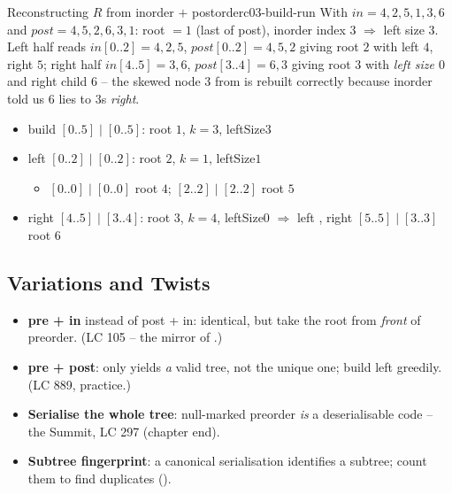\begin{example}{Reconstructing $R$ from inorder $+$ postorder}{c03-build-run}
With $\mathit{in}=4,2,5,1,3,6$ and $\mathit{post}=4,5,2,6,3,1$: root $=1$ (last of post),
inorder index $3$ $\Rightarrow$ left size $3$. Left half reads $\mathit{in}[0..2]=4,2,5$,
$\mathit{post}[0..2]=4,5,2$ giving root $2$ with left $4$, right $5$; right half
$\mathit{in}[4..5]=3,6$, $\mathit{post}[3..4]=6,3$ giving root $3$ with \emph{left size
$0$} and right child $6$ -- the skewed node $3$ from  is rebuilt
correctly because inorder told us $6$ lies to $3$\textquotesingle s \emph{right}.
\end{example}
\begin{tracebox}
\begin{itemize}[nosep, leftmargin=1.4em]
  \item build $[0..5]\mid[0..5]$: root $1$, $k{=}3$, leftSize$3$
  \item left $[0..2]\mid[0..2]$: root $2$, $k{=}1$, leftSize$1$
    \begin{itemize}[nosep,leftmargin=1.6em]
      \item $[0..0]\mid[0..0]$ root $4$; $[2..2]\mid[2..2]$ root $5$
    \end{itemize}
  \item right $[4..5]\mid[3..4]$: root $3$, $k{=}4$, leftSize$0$ $\Rightarrow$ left
        \nil, right $[5..5]\mid[3..3]$ root $6$
\end{itemize}
\end{tracebox}

\subsection{Variations and Twists}

\begin{itemize}[nosep]
  \item \textbf{pre + in} instead of post + in: identical, but take the root from
        \emph{front} of preorder. (LC 105 -- the mirror of .) \hfill{}
  \item \textbf{pre + post}: only yields \emph{a} valid tree, not the unique one; build
        left greedily. (LC 889,  practice.)        \hfill{}
  \item \textbf{Serialise the whole tree}: null-marked preorder \emph{is} a
        deserialisable code -- the Summit, LC 297 (chapter end).        \hfill{}
  \item \textbf{Subtree fingerprint}: a canonical serialisation identifies a subtree; count
        them to find duplicates ().          \hfill{}
\end{itemize}

